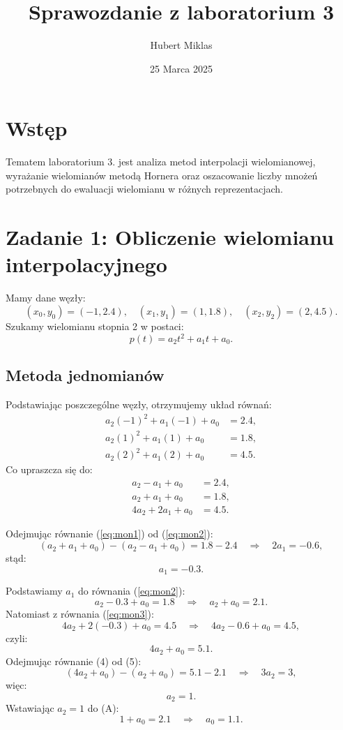 \documentclass{article}
\title{Sprawozdanie z laboratorium 3}
\author{Hubert Miklas}
\date{25 Marca 2025}
\begin{document}
\maketitle

\section{Wstęp}
Tematem laboratorium 3. jest analiza metod interpolacji wielomianowej, 
wyrażanie wielomianów metodą Hornera oraz oszacowanie liczby mnożeń 
potrzebnych do ewaluacji wielomianu w różnych reprezentacjach.

\section{Zadanie 1: Obliczenie wielomianu interpolacyjnego}

Mamy dane węzły:
\[
(x_0,y_0)=(-1,2.4), \quad (x_1,y_1)=(1,1.8), \quad (x_2,y_2)=(2,4.5).
\]
Szukamy wielomianu stopnia 2 w postaci:
\[
p(t)=a_2 t^2+a_1 t+a_0.
\]

\subsection{Metoda jednomianów}
Podstawiając poszczególne węzły, otrzymujemy układ równań:
\begin{align}
a_2(-1)^2 + a_1(-1) + a_0 &= 2.4, \label{eq:mon1}\\
a_2(1)^2 + a_1(1) + a_0 &= 1.8, \label{eq:mon2}\\
a_2(2)^2 + a_1(2) + a_0 &= 4.5. \label{eq:mon3}
\end{align}
Co upraszcza się do:
\begin{align*}
a_2 - a_1 + a_0 &= 2.4, \\
a_2 + a_1 + a_0 &= 1.8, \\
4a_2 + 2a_1 + a_0 &= 4.5.
\end{align*}

Odejmując równanie (\ref{eq:mon1}) od (\ref{eq:mon2}):
\[
(a_2 + a_1 + a_0) - (a_2 - a_1 + a_0)= 1.8-2.4 \quad \Longrightarrow \quad 2a_1=-0.6,
\]
stąd:
\[
a_1=-0.3.
\]

Podstawiamy $a_1$ do równania (\ref{eq:mon2}):
\[
a_2 -0.3 + a_0 = 1.8 \quad \Longrightarrow \quad a_2 + a_0 = 2.1. \tag{4}
\]
Natomiast z równania (\ref{eq:mon3}):
\[
4a_2 + 2(-0.3) + a_0 = 4.5 \quad \Longrightarrow \quad 4a_2 -0.6 + a_0 = 4.5,
\]
czyli:
\[
4a_2 + a_0 = 5.1. \tag{5}
\]
Odejmując równanie (4) od (5):
\[
(4a_2 + a_0) - (a_2 + a_0)= 5.1-2.1 \quad \Longrightarrow \quad 3a_2=3,
\]
więc:
\[
a_2=1.
\]
Wstawiając $a_2=1$ do (A):
\[
1 + a_0 = 2.1 \quad \Longrightarrow \quad a_0=1.1.
\]
\end{document}
